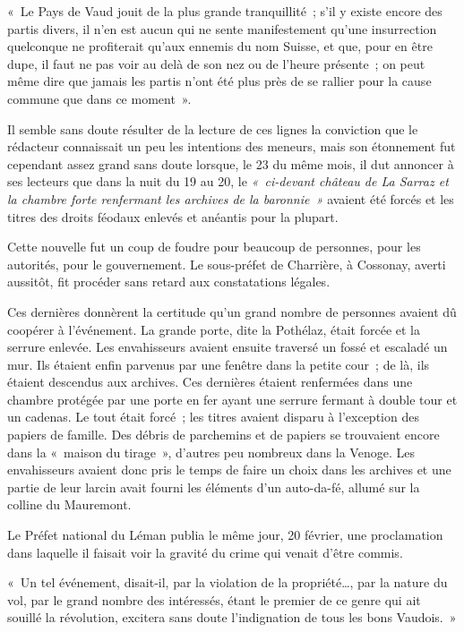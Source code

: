 \documentclass[french,twoside]{book} %
\newenvironment{quoteblock}%
  {\begin{quoting}}
  {\end{quoting}}
\newenvironment{quotebar}{%
    \def\FrameCommand{{\color{rubric!10!}\vrule width 0.5em} \hspace{0.9em}}%
    \def\OuterFrameSep{\itemsep} %
    \MakeFramed {\advance\hsize-\width \FrameRestore}
  }%
  {%
    \endMakeFramed
  }
\renewenvironment{quoteblock}%
  {%
    \savenotes
    \setstretch{0.9}
    \normalfont
    \begin{quotebar}
  }
  {%
    \end{quotebar}
    \spewnotes
  }
\begin{document}
\begin{quoteblock}
 \noindent « Le Pays de Vaud jouit de la plus grande tranquillité ; s’il y existe encore des partis divers, il n’en est aucun qui ne sente manifestement qu’une insurrection quelconque ne profiterait qu’aux ennemis du nom Suisse, et que, pour en être dupe, il faut ne pas voir au delà de son nez ou de l’heure présente ; on peut même dire que jamais les partis n’ont été plus près de se rallier pour la cause commune que dans ce moment ».
 \end{quoteblock}

\noindent Il semble sans doute résulter de la lecture de ces lignes la conviction que le rédacteur connaissait un peu les intentions des meneurs, mais son étonnement fut cependant assez grand sans doute lorsque, le 23 du même mois, il dut annoncer à ses lecteurs que dans la nuit du 19 au 20, le \emph{« ci-devant château de La Sarraz et la chambre forte renfermant les archives de la baronnie »} avaient été forcés et les titres des droits féodaux enlevés et anéantis pour la plupart.\par
Cette nouvelle fut un coup de foudre pour beaucoup de personnes, pour les autorités, pour le gouvernement. Le sous-préfet de Charrière, à Cossonay, averti aussitôt, fit procéder sans retard aux constatations légales.\par
Ces dernières donnèrent la certitude qu’un grand nombre de personnes avaient dû coopérer à l’événement. La grande porte, dite la Pothélaz, était forcée et la serrure enlevée. Les envahisseurs avaient ensuite traversé un fossé et escaladé un mur. Ils étaient enfin parvenus par une fenêtre dans la petite cour ; de là, ils étaient descendus aux archives. Ces dernières étaient renfermées dans une chambre protégée par une porte en fer ayant une serrure fermant à double tour et un cadenas. Le tout était forcé ; les titres avaient disparu à l’exception des papiers de famille. Des débris de parchemins et de papiers se trouvaient encore dans la « maison du tirage », d’autres peu nombreux dans la Venoge. Les envahisseurs avaient donc pris le temps de faire un choix dans les archives et une partie de leur larcin avait fourni les éléments d’un auto-da-fé, allumé sur la colline du Mauremont.\par
Le Préfet national du Léman publia le même jour, 20 février, une proclamation dans laquelle il faisait voir la gravité du crime qui venait d’être commis.\par

\begin{quoteblock}
\noindent « Un tel événement, disait-il, par la violation de la propriété…, par la nature du vol, par le grand nombre des intéressés, étant le premier de ce genre qui ait souillé la révolution, excitera sans doute l’indignation de tous les bons Vaudois. »\end{quoteblock}
\end{document}
